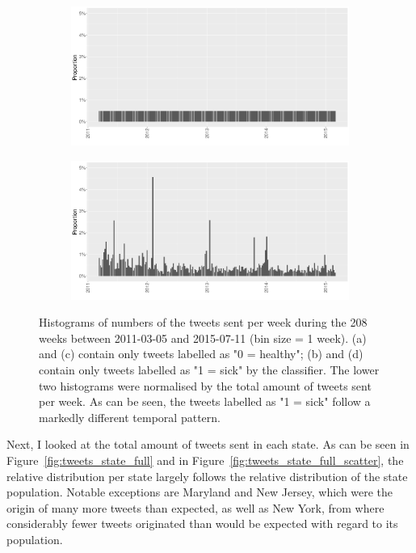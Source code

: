 \documentclass[11pt, a4paper]{report}\usepackage[]{graphicx}\usepackage[]{color}
\begin{document}
\begin{figure}[h]
    \begin{subfigure}[t]{0.49\textwidth}
  \includegraphics[width=1\linewidth]{activity_rel_healthy_date_Twitter_full_aggregated.png}
  \caption{}
  \end{subfigure}
  \hfill
    \begin{subfigure}[t]{0.49\textwidth}
  \includegraphics[width=1\linewidth]{activity_rel_sick_date_Twitter_full_aggregated.png}
  \caption{}
  \end{subfigure}
  \caption{Histograms of numbers of the tweets sent per week during the 208 weeks between 2011-03-05 and 2015-07-11 (bin size = 1 week). (a) and (c) contain only tweets labelled as "0 = healthy"; (b) and (d) contain only tweets labelled as "1 = sick" by the classifier. The lower two histograms were normalised by the total amount of tweets sent per week. As can be seen, the tweets labelled as "1 = sick" follow a markedly different temporal pattern.}
  \label{fig:tweets_seasonal_healthy_sick}
\end{figure}

Next, I looked at the total amount of tweets sent in each state. As can be seen in Figure~\ref{fig:tweets_state_full} and in Figure~\ref{fig:tweets_state_full_scatter}, the relative distribution per state largely follows the relative distribution of the state population. Notable exceptions are Maryland and New Jersey, which were the origin of many more tweets than expected, as well as New York, from where considerably fewer tweets originated than would be expected with regard to its population.\newline
\end{document}
